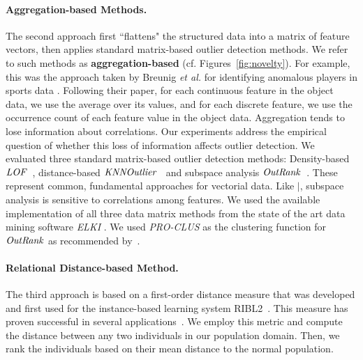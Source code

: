 {					%
					\paragraph{Aggregation-based Methods.}
					The second approach first ``flattens" the structured data into a matrix of feature vectors, then applies standard matrix-based outlier detection methods. We refer to such methods as \textbf{aggregation-based}
					(cf. Figures~\ref{fig:novelty}). For example, this was the approach taken by Breunig {\em et al.} for identifying anomalous players in sports data \cite{Breunig2000}. Following their paper, for each continuous feature in the object data, we use the average over its values, and for each discrete feature, we use the occurrence count of each feature value in the object data. Aggregation 
					tends to lose information about correlations.
					Our experiments address the empirical question of whether this loss of information affects outlier detection. 
					We evaluated three standard matrix-based outlier detection methods: Density-based $\it{LOF}$~\cite{Breunig2000}, distance-based $\it{KNNOutlier}$~\cite{Ramaswamy2000} and subspace analysis $\it{OutRank}$~\cite{Muller2012}.
					These represent common, fundamental  approaches for vectorial data. 
					Like $\mid$, subspace analysis is sensitive to correlations among features. 
					We used the available implementation of all three data matrix methods from the state of the art data mining software \textit{ELKI} \cite{Elke2013}. We used \textit{PRO-CLUS} as the clustering function for $\it{OutRank}$ as recommended by~\cite{Muller2012}.
					
						\paragraph{Relational Distance-based Method.}
						The third approach is based on a first-order distance measure that was developed and first used for the instance-based learning system RIBL2~\cite{Horvath2001}. This measure has proven  successful in several applications~\cite{Kirsten2001,Horvath1999}. We employ this metric and compute the distance between any two individuals in our population domain. Then, we rank the individuals based on their mean distance to the normal population.
					
}
